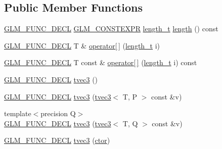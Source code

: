 \subsection*{Public Member Functions}
\begin{DoxyCompactItemize}
\item 
\hyperlink{setup_8hpp_ab2d052de21a70539923e9bcbf6e83a51}{G\+L\+M\+\_\+\+F\+U\+N\+C\+\_\+\+D\+E\+CL} \hyperlink{setup_8hpp_a08b807947b47031d3a511f03f89645ad}{G\+L\+M\+\_\+\+C\+O\+N\+S\+T\+E\+X\+PR} \hyperlink{namespaceglm_a090a0de2260835bee80e71a702492ed9}{length\+\_\+t} \hyperlink{structglm_1_1detail_1_1tvec3_addf9d65fbb0e5d6dc080e071d730299b}{length} () const
\item 
\hyperlink{setup_8hpp_ab2d052de21a70539923e9bcbf6e83a51}{G\+L\+M\+\_\+\+F\+U\+N\+C\+\_\+\+D\+E\+CL} T \& \hyperlink{structglm_1_1detail_1_1tvec3_a45e7f76041f4836b8855395fb8c6e244}{operator\mbox{[}$\,$\mbox{]}} (\hyperlink{namespaceglm_a090a0de2260835bee80e71a702492ed9}{length\+\_\+t} i)
\item 
\hyperlink{setup_8hpp_ab2d052de21a70539923e9bcbf6e83a51}{G\+L\+M\+\_\+\+F\+U\+N\+C\+\_\+\+D\+E\+CL} T const  \& \hyperlink{structglm_1_1detail_1_1tvec3_a4e150d5265e619688a7276366a7415e1}{operator\mbox{[}$\,$\mbox{]}} (\hyperlink{namespaceglm_a090a0de2260835bee80e71a702492ed9}{length\+\_\+t} i) const
\item 
\hyperlink{setup_8hpp_ab2d052de21a70539923e9bcbf6e83a51}{G\+L\+M\+\_\+\+F\+U\+N\+C\+\_\+\+D\+E\+CL} \hyperlink{structglm_1_1detail_1_1tvec3_a510b6aef2ca2564fda377a9aa4249545}{tvec3} ()
\item 
\hyperlink{setup_8hpp_ab2d052de21a70539923e9bcbf6e83a51}{G\+L\+M\+\_\+\+F\+U\+N\+C\+\_\+\+D\+E\+CL} \hyperlink{structglm_1_1detail_1_1tvec3_a4f0be98873dfb6134d369f817dcb9478}{tvec3} (\hyperlink{structglm_1_1detail_1_1tvec3}{tvec3}$<$ T, P $>$ const \&v)
\item 
{\footnotesize template$<$precision Q$>$ }\\\hyperlink{setup_8hpp_ab2d052de21a70539923e9bcbf6e83a51}{G\+L\+M\+\_\+\+F\+U\+N\+C\+\_\+\+D\+E\+CL} \hyperlink{structglm_1_1detail_1_1tvec3_ae092787775d3e74cf242744892eb3923}{tvec3} (\hyperlink{structglm_1_1detail_1_1tvec3}{tvec3}$<$ T, Q $>$ const \&v)
\item 
\hyperlink{setup_8hpp_ab2d052de21a70539923e9bcbf6e83a51}{G\+L\+M\+\_\+\+F\+U\+N\+C\+\_\+\+D\+E\+CL} \hyperlink{structglm_1_1detail_1_1tvec3_a5c1bc887c279d54e39c038c1f201e60b}{tvec3} (\hyperlink{structglm_1_1detail_1_1tvec3_a370bdb3bb793461504b1387daec78083}{ctor})
\item 

\end{DoxyCompactItemize}

